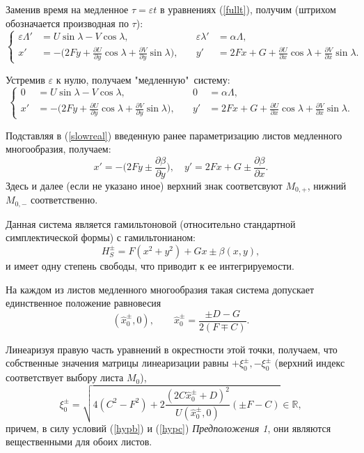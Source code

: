 Заменив время на медленное $\tau = \varepsilon t$ в уравнениях (\ref{fullt}), получим (штрихом обозначается производная по $\tau$):
\begin{equation}
    \left\{
    \begin{aligned}
        \varepsilon \Lambda' &= U \sin \lambda - V \cos \lambda,
        &\quad
        \varepsilon \lambda' &= \alpha \Lambda,\\
        x' &= - \big( 2Fy+\frac{\partial U}{\partial y} \cos \lambda + \frac{\partial V}{\partial y} \sin \lambda \big),
        &\quad
        y' &= 2Fx+G +\frac{\partial U}{\partial x} \cos \lambda + \frac{\partial V}{\partial x} \sin \lambda.
    \end{aligned}
    \right.
    \label{fulltau}
\end{equation}

Устремив $\varepsilon$ к нулю, получаем "медленную"\, систему:
\begin{equation}
    \left\{
    \begin{aligned}
        0 &= U \sin \lambda - V \cos \lambda,
        &\quad
        0 &= \alpha \Lambda, \\
        x' &= -\big( 2Fy+\frac{\partial U}{\partial y} \cos \lambda + \frac{\partial V}{\partial y} \sin \lambda \big),
        &\quad
        y' &= 2Fx+G +\frac{\partial U}{\partial x} \cos \lambda + \frac{\partial V}{\partial x} \sin \lambda.
    \end{aligned}
    \right.
    \label{slowreal}
\end{equation}

Подставляя в (\ref{slowreal}) введенную ранее параметризацию листов медленного многообразия, получаем:
$$
        x' = - \bigg( 2Fy \pm \frac{\partial \beta}{\partial y} \bigg),
        \quad
        y' = 2Fx+G \pm \frac{\partial \beta}{\partial x}.
    \label{slow_sys}
$$
Здесь и далее (если не указано иное) верхний знак соответсвуют $M_{0,+}$, нижний $M_{0,-}$ соответственно.

Данная система является гамильтоновой (относительно стандартной симплектической формы) с гамильтонианом:
$$H_S^\pm = F(x^2+y^2) + Gx \pm \beta(x,y),$$
и имеет одну степень свободы, что приводит к ее интегрируемости.

На каждом из листов медленного многообразия такая система допускает единственное положение равновесия
$$(\hat x_0^\pm, 0), \qquad
\hat x_0^{\pm} = \frac{\pm D - G}{2(F \mp C)}.
$$

Линеаризуя правую часть уравнений в окрестности этой точки, получаем,
что собственные значения матрицы линеаризации равны $+\xi_0^\pm, -\xi_0^\pm$ (верхний индекс соответствует выбору листа $M_0$),
\begin{equation}
    \xi_0^\pm = \sqrt{4(C^2-F^2) + 2\frac{(2C \hat x_0^\pm +  D)^2}{ U(\hat x_0^\pm,0)}(\pm F - C)} \in \mathbb{R},
\label{slowsyseigen}
\end{equation}
причем, в силу условий (\ref{hypb}) и (\ref{hypc}) \textit{Предположения 1}, они являются вещественными для обоих листов.


